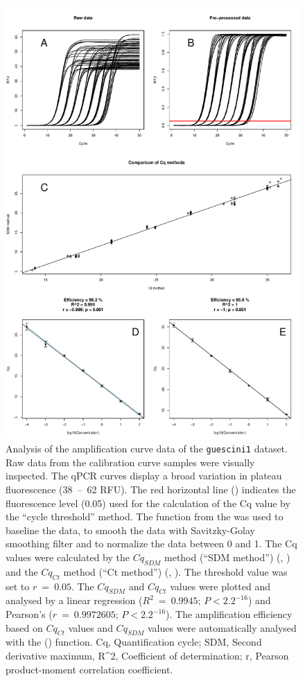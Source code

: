 \begin{figure}[htbp]
  \centering
  \includegraphics[clip=true, width=12cm]{figures/dilution_Cq.pdf}
  \caption{Analysis of the amplification curve data of the \texttt{guescini1} 
dataset.  Raw data from the calibration curve samples were visually 
inspected. The qPCR curves display a broad variation in plateau fluorescence 
(38~--~62 RFU). The red horizontal line (\textcolor{red}\textemdash) indicates 
the fluorescence level (0.05) used for the calculation of the Cq value by the 
``cycle threshold'' method.  The  function from the 
 was used to baseline the data, to smooth the data with 
Savitzky-Golay smoothing filter and to normalize the data between 0 and 1. 
 The Cq values were calculated by the $Cq_{SDM}$ method (``SDM 
method'') (, ) and the $Cq_{Ct}$ method (``Ct 
method'') (, ). The threshold value was set to 
$r~=~0.05$. The $Cq_{SDM}$ and $Cq_{Ct}$ values were plotted and analysed by a 
linear regression ($R^{2}~=~0.9945$; $P < 2.2^{-16}$) and Pearson's 
($r~=~0.9972605$; $P < 2.2^{-16}$). The amplification efficiency based on 
 $Cq_{Ct}$ values and  $Cq_{SDM}$ values were 
automatically analysed with the  () function. Cq, 
Quantification cycle; SDM, Second derivative maximum, R\textasciicircum2, 
Coefficient of determination; r, Pearson product-moment correlation 
coefficient.}
  \label{figure:dilution_Cq}
\end{figure}

